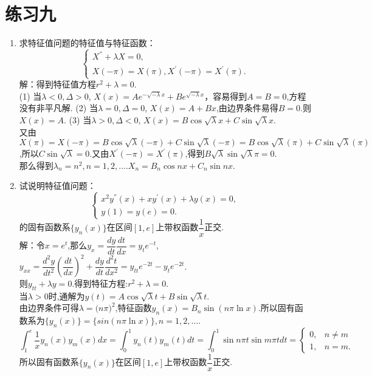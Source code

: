 \documentclass[11pt]{article}
\begin{document}
\section*{练习九}
    \begin{enumerate}
        \item 求特征值问题的特征值与特征函数：
           \[
        \left\{
         \begin{array}{lr}
         X^{''}+\lambda X=0, \\
         X(-\pi)=X(\pi),X^{'}(-\pi)=X^{'}(\pi).
         \end{array}
        \right. \]
            解：得到特征值方程$r^2+\lambda=0$.\\
            \subitem(1) 当$\lambda <0, \Delta >0$, $X(x)=Ae^{-\sqrt {-\lambda}x}+Be^{\sqrt {-\lambda}x}$，容易得到$A=B=0$,方程没有非平凡解.
            \subitem(2) 当$\lambda =0, \Delta =0$, $X(x)=A +Bx$,由边界条件易得$B=0$.则$X(x)=A$.
            \subitem(3) 当$\lambda >0, \Delta <0$, $X(x)=B\cos\sqrt {\lambda}x+C\sin\sqrt {\lambda}x$.\\又由$X(\pi)=X(-\pi)=B\cos\sqrt{\lambda}(-\pi)+C\sin\sqrt{\lambda}(-\pi)=B\cos\sqrt{\lambda}(\pi)+C\sin\sqrt{\lambda}(\pi)$,所以$C\sin\sqrt{\lambda}=0$.又由$X^{'}(-\pi)=X^{'}(\pi)$,得到$B\sqrt{\lambda}\sin\sqrt{\lambda}\pi=0$.\\那么得到$\lambda_n=n^2,n=1,2,\dots$.$X_n=B_n\cos nx+C_n\sin nx$.




        \item 试说明特征值问题：
           \[
        \left\{
         \begin{array}{lr}
         x^{2}y^{''}(x)+xy^{'}(x)+\lambda y(x)=0,\\
         y(1)=y(e)=0.
         \end{array}
        \right. \]
        的固有函数系$\{y_n(x)\}$在区间$[1,e]$上带权函数$\dfrac{1}{x}$正交.
            \\[8pt]解：令$x=e^t$,那么$y_x=\dfrac{dy}{dt}\dfrac{dt}{dx}=y_te^{-t}$,\quad $y_{xx}=\dfrac{d^2y}{dt^2}(\dfrac{dt}{dx})^2+\dfrac{dy}{dt}\dfrac{d^2t}{dx^2}=y_{tt}e^{-2t}-y_te^{-2t}$.\\[8pt]则$y_{tt}+\lambda y=0$.得到特征方程:$r^2+\lambda=0$.\\当$\lambda>0$时,通解为$y(t)=A\cos\sqrt{\lambda}t+B\sin\sqrt{\lambda}t$.\\由边界条件可得$\lambda=\big(n\pi\big)^2$,特征函数$y_n(x)=B_n\sin(n\pi\ln x)$.所以固有函数系为$\{y_n(x)\}=\{sin(n\pi\ln x)\},n=1,2,\dots$.
            \[
            \int_{1}^{e}\frac{1}{x}y_n(x)y_m(x)dx=\int_{0}^{1}y_n(t)y_m(t)dt=\int_{0}^{1}\sin n\pi t\sin m\pi tdt=\begin{cases}0, & n\neq m\\1, & n=m.\end{cases}
            \]
            所以固有函数系$\{y_n(x)\}$在区间$[1,e]$上带权函数$\dfrac{1}{x}$正交.
    \end{enumerate}
\end{document}
